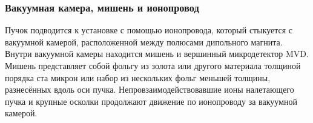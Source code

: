 
\subsubsection{Вакуумная камера, мишень и ионопровод}\label{sec:secVacChamberPipe}

Пучок подводится к установке с помощью ионопровода, который стыкуется с вакуумной камерой, расположенной между полюсами дипольного магнита. Внутри вакуумной камеры находится мишень и вершинный микродетектор MVD. Мишень представляет собой фольгу из золота или другого материала толщиной порядка ста микрон или набор из нескольких фольг меньшей толщины, разнесённых вдоль оси пучка. Непровзаимодействовавшие ионы налетающего пучка и крупные осколки продолжают движение по ионопроводу за вакуумной камерой.

